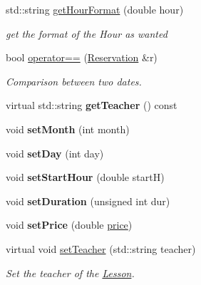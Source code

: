 \begin{DoxyCompactItemize}
std\+::string \mbox{\hyperlink{class_reservation_a36aa0b30371103b07aa331b33e6109d1}{get\+Hour\+Format}} (double hour)
\begin{DoxyCompactList}\small\item\em get the format of the Hour as wanted \end{DoxyCompactList}\item 
bool \mbox{\hyperlink{class_reservation_a228b1145e4b553c2f98d958a84de5ac1}{operator==}} (\mbox{\hyperlink{class_reservation}{Reservation}} \&r)
\begin{DoxyCompactList}\small\item\em Comparison between two dates. \end{DoxyCompactList}\item 
\mbox{\label{class_reservation_a70e2ac8be972694f0a5fcf87d26e7e78}} 
virtual std\+::string {\bfseries get\+Teacher} () const
\item 
\mbox{\label{class_reservation_a9c96fba7c2da34d8edcf9cbbdc906fee}} 
void {\bfseries set\+Month} (int month)
\item 
\mbox{\label{class_reservation_a82dafec642b54ee9c5bfe1828bb7db80}} 
void {\bfseries set\+Day} (int day)
\item 
\mbox{\label{class_reservation_a5ee29168d8b238016732a3d04991bf40}} 
void {\bfseries set\+Start\+Hour} (double startH)
\item 
\mbox{\label{class_reservation_abcf269d2f718f33bea8f4f90e8248d11}} 
void {\bfseries set\+Duration} (unsigned int dur)
\item 
\mbox{\label{class_reservation_ac6ebe4b7db1ae78f11af83527f9405a6}} 
void {\bfseries set\+Price} (double \mbox{\hyperlink{class_reservation_a82e197bd30e7949ee9b8616ee4eacf83}{price}})
\item 
virtual void \mbox{\hyperlink{class_reservation_afa8eadd14292a52c6a404078690a7f87}{set\+Teacher}} (std\+::string teacher)
\begin{DoxyCompactList}\small\item\em Set the teacher of the \mbox{\hyperlink{class_lesson}{Lesson}}. \end{DoxyCompactList}\end{DoxyCompactItemize}
